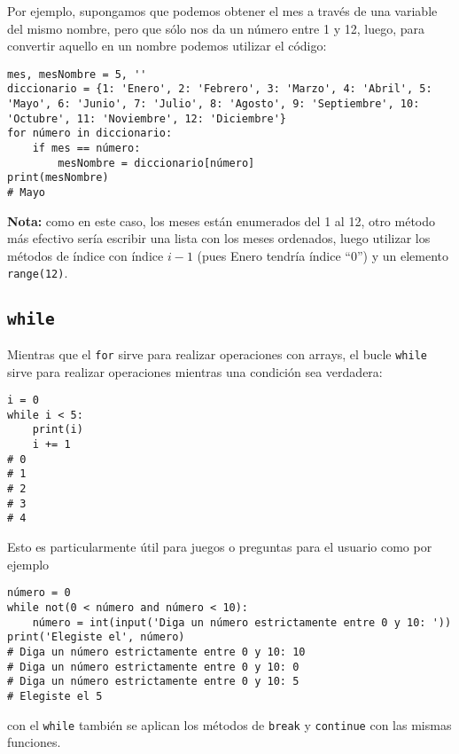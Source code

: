 \documentclass[11pt,twoside]{report}
\begin{document}
Por ejemplo, supongamos que podemos obtener el mes a través de una variable del mismo nombre, pero que sólo nos da un número entre 1 y 12, luego, para convertir aquello en un nombre podemos utilizar el código:
\begin{lstlisting}
mes, mesNombre = 5, ''
diccionario = {1: 'Enero', 2: 'Febrero', 3: 'Marzo', 4: 'Abril', 5: 'Mayo', 6: 'Junio', 7: 'Julio', 8: 'Agosto', 9: 'Septiembre', 10: 'Octubre', 11: 'Noviembre', 12: 'Diciembre'}
for número in diccionario:
    if mes == número:
        mesNombre = diccionario[número]
print(mesNombre)
# Mayo
\end{lstlisting}
\textbf{Nota:} como en este caso, los meses están enumerados del 1 al 12, otro método más efectivo sería escribir una lista con los meses ordenados, luego utilizar los métodos de índice con índice $i-1$ (pues Enero tendría índice ``0'') y un elemento \lstinline|range(12)|.

\subsection{\texttt{while}}
Mientras que el \lstinline|for| sirve para realizar operaciones con arrays, el bucle \lstinline|while| sirve para realizar operaciones mientras una condición sea verdadera:
\begin{lstlisting}
i = 0
while i < 5:
    print(i)
    i += 1
# 0
# 1
# 2
# 3
# 4
\end{lstlisting}
Esto es particularmente útil para juegos o preguntas para el usuario como por ejemplo
\begin{lstlisting}
número = 0
while not(0 < número and número < 10):
    número = int(input('Diga un número estrictamente entre 0 y 10: '))
print('Elegiste el', número)
# Diga un número estrictamente entre 0 y 10: 10
# Diga un número estrictamente entre 0 y 10: 0
# Diga un número estrictamente entre 0 y 10: 5
# Elegiste el 5
\end{lstlisting}
con el \lstinline|while| también se aplican los métodos de \lstinline|break| y \lstinline|continue| con las mismas funciones.
\end{document}
